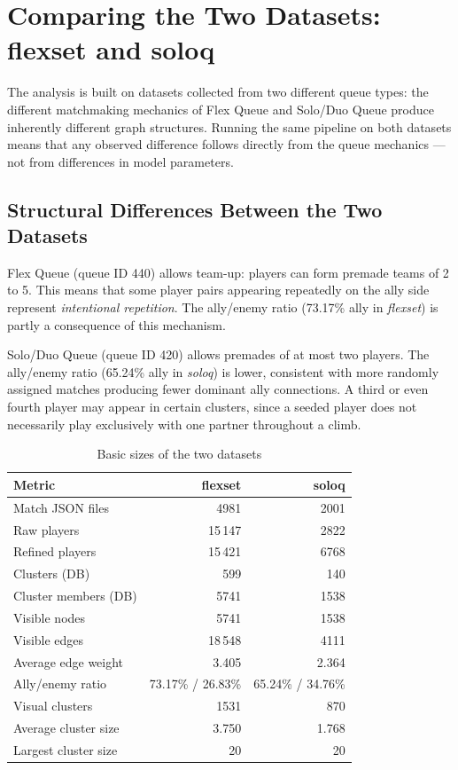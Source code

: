 \chapter{Comparing the Two Datasets: flexset and soloq}

The analysis is built on datasets collected from two different queue types: the different matchmaking mechanics of Flex Queue and Solo/Duo Queue produce inherently different graph structures. Running the same pipeline on both datasets means that any observed difference follows directly from the queue mechanics --- not from differences in model parameters.

\section{Structural Differences Between the Two Datasets}

Flex Queue (queue ID 440) allows team-up: players can form premade teams of 2 to 5. This means that some player pairs appearing repeatedly on the ally side represent \emph{intentional repetition}. The ally/enemy ratio (73.17\% ally in \textit{flexset}) is partly a consequence of this mechanism.

Solo/Duo Queue (queue ID 420) allows premades of at most two players. The ally/enemy ratio (65.24\% ally in \textit{soloq}) is lower, consistent with more randomly assigned matches producing fewer dominant ally connections. A third or even fourth player may appear in certain clusters, since a seeded player does not necessarily play exclusively with one partner throughout a climb.

\begin{table}[H]
\centering
\caption{Basic sizes of the two datasets}
\begin{tabularx}{\textwidth}{|>{\raggedright\arraybackslash}p{5cm}|r|r|}
\hline
\textbf{Metric} & \textbf{flexset} & \textbf{soloq} \\
\hline
Match JSON files & 4981 & 2001 \\
Raw players & 15\,147 & 2822 \\
Refined players & 15\,421 & 6768 \\
Clusters (DB) & 599 & 140 \\
Cluster members (DB) & 5741 & 1538 \\
Visible nodes & 5741 & 1538 \\
Visible edges & 18\,548 & 4111 \\
Average edge weight & 3.405 & 2.364 \\
Ally/enemy ratio & 73.17\% / 26.83\% & 65.24\% / 34.76\% \\
Visual clusters & 1531 & 870 \\
Average cluster size & 3.750 & 1.768 \\
Largest cluster size & 20 & 20 \\
\hline
\end{tabularx}
\end{table}

